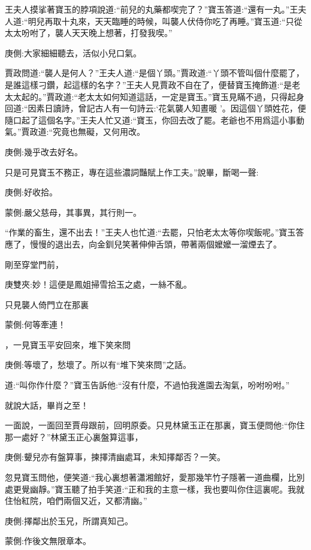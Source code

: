 \begin{parag}
    王夫人摸挲著寶玉的脖項說道:“前兒的丸藥都喫完了？”寶玉答道:“還有一丸。”王夫人道:“明兒再取十丸來，天天臨睡的時候，叫襲人伏侍你吃了再睡。”寶玉道:“只從太太吩咐了，襲人天天晚上想著，打發我喫。”\begin{note}庚側:大家細細聽去，活似小兒口氣。\end{note}賈政問道:“襲人是何人？”王夫人道:“是個丫頭。”賈政道:“丫頭不管叫個什麼罷了，是誰這樣刁鑽，起這樣的名字？”王夫人見賈政不自在了，便替寶玉掩飾道:“是老太太起的。”賈政道:“老太太如何知道這話，一定是寶玉。”寶玉見瞞不過，只得起身回道:“因素日讀詩，曾記古人有一句詩云:‘花氣襲人知晝暖 ’。因這個丫頭姓花，便隨口起了這個名字。”王夫人忙又道:“寶玉，你回去改了罷。老爺也不用爲這小事動氣。”賈政道:“究竟也無礙，又何用改。\begin{note}庚側:幾乎改去好名。\end{note}只是可見寶玉不務正，專在這些濃詞豔賦上作工夫。”說畢，斷喝一聲:\begin{note}庚側:好收拾。\end{note}\begin{note}蒙側:嚴父慈母，其事異，其行則一。\end{note}“作業的畜生，還不出去！”王夫人也忙道:“去罷，只怕老太太等你喫飯呢。”寶玉答應了，慢慢的退出去，向金釧兒笑著伸伸舌頭，帶著兩個嬤嬤一溜煙去了。
\end{parag}


\begin{parag}
    剛至穿堂門前，\begin{note}庚雙夾:妙！這便是鳳姐掃雪拾玉之處，一絲不亂。\end{note}只見襲人倚門立在那裏\begin{note}蒙側:何等牽連！\end{note}，一見寶玉平安回來，堆下笑來問\begin{note}庚側:等壞了，愁壞了。所以有“堆下笑來問”之話。\end{note}道:“叫你作什麼？”寶玉告訴他:“沒有什麼，不過怕我進園去淘氣，吩咐吩咐。”\begin{note}就說大話，畢肖之至！\end{note}一面說，一面回至賈母跟前，回明原委。只見林黛玉正在那裏，寶玉便問他:“你住那一處好？”林黛玉正心裏盤算這事，\begin{note}庚側:顰兒亦有盤算事，揀擇清幽處耳，未知擇鄰否？一笑。\end{note}忽見寶玉問他，便笑道:“我心裏想著瀟湘館好，愛那幾竿竹子隱著一道曲欄，比別處更覺幽靜。”寶玉聽了拍手笑道:“正和我的主意一樣，我也要叫你住這裏呢。我就住怡紅院，咱們兩個又近，又都清幽。”\begin{note}庚側:擇鄰出於玉兄，所謂真知己。\end{note}\begin{note}蒙側:作後文無限章本。\end{note}
\end{parag}


